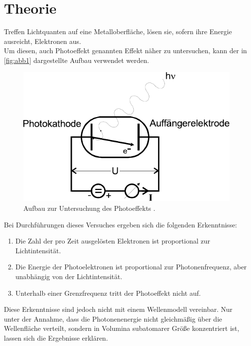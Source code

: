 \section{Theorie}
\label{sec:theorie}

Treffen Lichtquanten auf eine Metalloberfläche,
lösen sie, sofern ihre Energie ausreicht, Elektronen aus. \\

Um diesen, auch Photoeffekt genannten Effekt näher zu untersuchen,
kann der in \autoref{fig:abb1} dargestellte Aufbau verwendet werden.

\begin{figure}[H]
    \centering
    \includegraphics{figures/Abb1.pdf}
    \caption{Aufbau zur Untersuchung des Photoeffekts \cite{ap10}.}
    \label{fig:abb1}
\end{figure}

Bei Durchführungen dieses Versuches ergeben sich die folgenden Erkenntnisse:

\begin{enumerate}
    \item Die Zahl der pro Zeit ausgelösten Elektronen ist proportional zur Lichtintensität.
    \item Die Energie der Photoelektronen ist proportional zur Photonenfrequenz, aber unabhängig von der Lichtintensität.
    \item Unterhalb einer Grenzfrequenz tritt der Photoeffekt nicht auf.
\end{enumerate}

Diese Erkenntnisse sind jedoch nicht mit einem Wellenmodell vereinbar.
Nur unter der Annahme, dass die Photonenenergie nicht gleichmäßig über die Wellenfläche verteilt,
sondern in Volumina subatomarer Größe konzentriert ist, lassen sich die Ergebnisse erklären. \\

